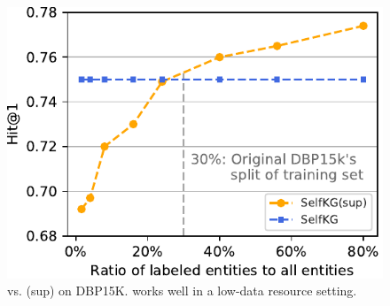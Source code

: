 \begin{figure}
    \centering
        \setlength{\abovecaptionskip}{2mm}
        \includegraphics[width=0.9\linewidth]{img/sup.pdf}
        \caption{\solution vs. \solution(sup) on DBP15K. \textmd{\solution works well in a low-data resource setting.}}
        \label{fig:sup}
        \vspace{-0.4cm}
\end{figure}
